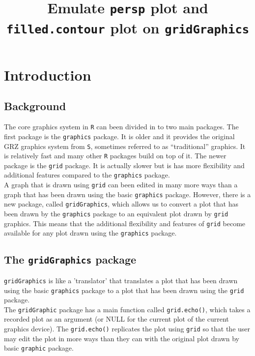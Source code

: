 \documentclass[paper=a4, fontsize=11pt]{report}
\begin{document}

\setlength{\parindent}{0}
\noindent

\title{Emulate \texttt{persp} plot and \texttt{filled.contour} plot on \texttt{gridGraphics}}
\maketitle
\tableofcontents
\chapter{Introduction}
\section{Background}
The core graphics system in \texttt{R} can been divided in to two main packages. The first package is the \texttt{graphics} package. It is older and it provides the original GRZ graphics system from \texttt{S}, sometimes referred to as ``traditional'' graphics. It is relatively fast and many other \texttt{R} packages build on top of it. The newer package is the \texttt{grid} package. It is actually slower but is has more flexibility and additional features compared to the \texttt{graphics} package. \\

A graph that is drawn using \texttt{grid} can been edited in many more ways than a graph that has been drawn using the basic \texttt{graphics} package. However, there is a new package, called \texttt{gridGraphics}, which allows us to convert a plot that has been drawn by the \texttt{graphics} package to an equivalent plot drawn by \texttt{grid} graphics. This means that the additional flexibility and features of \texttt{grid} become available for any plot drawn using the \texttt{graphics} package. \\

\section{The \texttt{gridGraphics} package}
\texttt{gridGraphics} is like a 'translator' that translates a plot that has been drawn using the basic \texttt{graphics} package to a plot that has been drawn using the \texttt{grid} package. \\

The \texttt{gridGraphic} package has a main function called \texttt{grid.echo()}, which takes a recorded plot as an argument (or NULL for the current plot of the current graphics device). The \texttt{grid.echo()} replicates the plot using \texttt{grid} so that the user may edit the plot in more ways than they can with the original plot drawn by basic \texttt{graphic} package.\\
\end{document}
